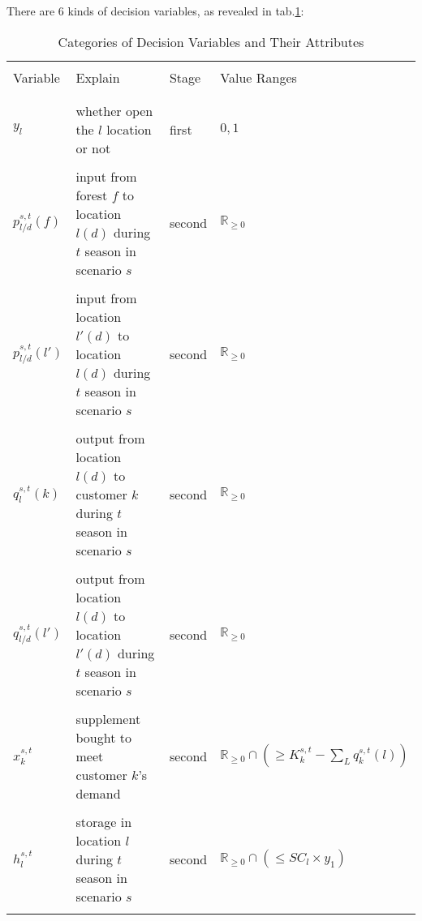 \documentclass[fleqn,10pt]{wlscirep}
\begin{document}
There are 6 kinds of decision variables, as revealed in tab.\ref{tab:1}:
\begin{table}[ht]
    \centering
    \begin{tabular}{l l l l}
        \hline
        \\[-1em]
        Variable & Explain & Stage & Value Ranges \\
        \\[-1em]
        \hline
        \\[-1em]
        $y_l$ & whether open the $l$ location or not & first & ${0, 1}$ \\
        \\[-1em]
        $p_{l/d}^{s, t}(f)$ & input from forest $f$ to location $l(d)$ during $t$ season in scenario $s$ & second & $\mathbb{R}_{\geq 0}$ \\
        \\[-1em]
        $p_{l/d}^{s, t}(l')$ & input from location $l'(d)$ to location $l(d)$ during $t$ season in scenario $s$ & second & $\mathbb{R}_{\geq 0}$ \\
        \\[-1em]
        $q_{l}^{s, t}(k)$ & output from location $l(d)$ to customer $k$ during $t$ season in scenario $s$ & second & $\mathbb{R}_{\geq 0}$ \\
        \\[-1em]
        $q_{l/d}^{s, t}(l')$ & output from location $l(d)$ to location $l'(d)$ during $t$ season in scenario $s$ & second & $\mathbb{R}_{\geq 0}$ \\
        \\[-1em]
        $x_{k}^{s, t}$ & supplement bought to meet customer $k$'s demand & second & $\mathbb{R}_{\geq 0} \cap (\geq K_{k}^{s, t} - \sum_{L} q_{k}^{s, t}(l)) $ \\
        \\[-1em]
        $h_{l}^{s, t}$ & storage in location $l$ during $t$ season in scenario $s$ & second & $\mathbb{R}_{\geq 0} \cap (\leq SC_{l} \times y_1)$ \\
        \\[-1em]
        \hline
    \end{tabular}
    \caption{Categories of Decision Variables and Their Attributes}
    \label{tab:1}
\end{table}
\FloatBarrier
\end{document}
